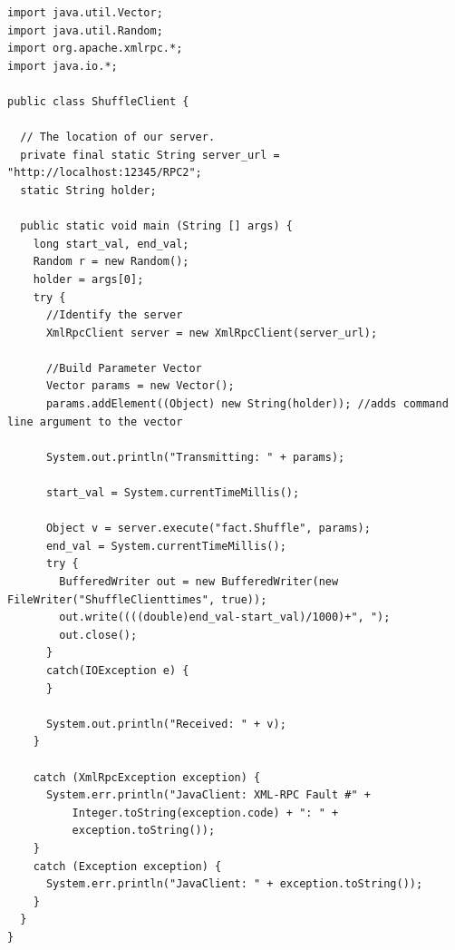 \documentclass{article}
\begin{document}
\begin{lstlisting}
import java.util.Vector;
import java.util.Random;
import org.apache.xmlrpc.*;
import java.io.*;

public class ShuffleClient {

  // The location of our server.
  private final static String server_url = "http://localhost:12345/RPC2"; 
  static String holder;
  
  public static void main (String [] args) {
    long start_val, end_val;
    Random r = new Random();
    holder = args[0];
    try {
      //Identify the server
      XmlRpcClient server = new XmlRpcClient(server_url);

      //Build Parameter Vector
      Vector params = new Vector();
      params.addElement((Object) new String(holder)); //adds command line argument to the vector

      System.out.println("Transmitting: " + params);

      start_val = System.currentTimeMillis();
      
      Object v = server.execute("fact.Shuffle", params);
      end_val = System.currentTimeMillis();
      try {
        BufferedWriter out = new BufferedWriter(new FileWriter("ShuffleClienttimes", true));
        out.write((((double)end_val-start_val)/1000)+", ");
        out.close();
      }
      catch(IOException e) {
      }
    
      System.out.println("Received: " + v);
    }

    catch (XmlRpcException exception) {
      System.err.println("JavaClient: XML-RPC Fault #" +
          Integer.toString(exception.code) + ": " +
          exception.toString());
    }
    catch (Exception exception) {
      System.err.println("JavaClient: " + exception.toString());
    }
  }
}

\end{lstlisting}
\end{document}
